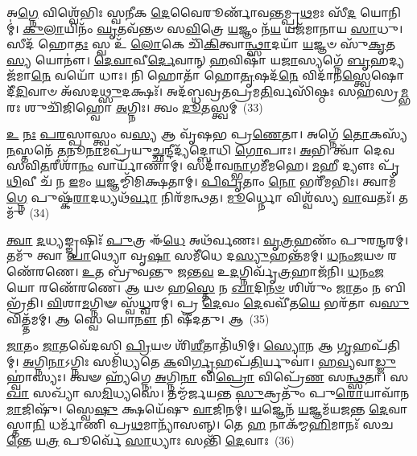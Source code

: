 𑌅\-\ul{𑌗𑍍𑌨𑍇} 𑌵𑌿𑌶𑍍𑌵𑍇᳴𑌭𑌿𑌃 𑌸𑍍𑌵𑌨𑍀𑌕 \ul{𑌦𑍇}\-𑌵𑍈𑌰𑍂𑌰𑍍𑌣𑌾᳴𑌵𑌨𑍍𑌤𑌮𑍍𑌪𑍍𑌰\-\ul{𑌥}\-𑌮𑌃 𑌸𑍀᳴\-\ul{𑌦} 𑌯𑍋𑌨𑌿𑌮𑍍॑। \ul{𑌕𑍁}\-\-\ul{𑌲𑌾}\-𑌯𑌿𑌨𑌂᳴ \ul{𑌘𑍃}\-𑌤𑌵᳴𑌨𑍍𑌤𑍞 𑌸\-\ul{𑌵𑌿}\-𑌤𑍍𑌰𑍇 \ul{𑌯}\-𑌜𑍍𑌞𑌂 𑌨᳴\-\ul{𑌯} 𑌯𑌜᳴𑌮𑌾𑌨𑌾𑌯 \ul{𑌸𑌾}\-𑌧𑍁। 𑌸𑍀𑌦᳴ 𑌹𑍋\-\ul{𑌤𑌃} 𑌸𑍍𑌵 𑌉᳴ \ul{𑌲𑍋}\-𑌕𑍇 𑌚𑌿᳴\-\ul{𑌕𑌿}\-𑌤𑍍𑌵𑌾\-\ul{𑌨𑍍𑌥𑍍𑌸𑌾}\-𑌦𑌯𑌾᳴ \ul{𑌯}\-𑌜𑍍𑌞𑍞 𑌸𑍁᳴\-\ul{𑌕𑍃}\-𑌤\-\ul{𑌸𑍍𑌯} 𑌯𑍋𑌨𑍗॑। \ul{𑌦𑍇}\-\-\ul{𑌵𑌾}\-𑌵𑍀\-\ul{𑌰𑍍𑌦𑍇}\-𑌵𑌾𑌨𑍍 \ul{𑌹}\-𑌵𑌿𑌷𑌾᳴ 𑌯\-\ul{𑌜𑌾}\-𑌸𑍍𑌯𑌗𑍍𑌨𑍇᳴ \ul{𑌬𑍃}\-𑌹𑌦𑍍𑌯𑌜᳴𑌮𑌾\-\ul{𑌨𑍇} 𑌵𑌯𑍋᳴ 𑌧𑌾𑌃। 𑌨𑌿 𑌹𑍋𑌤𑌾᳴ 𑌹𑍋\-\ul{𑌤𑍃}\-𑌷𑌦᳴\-\ul{𑌨𑍇} 𑌵𑌿𑌦𑌾᳴𑌨\-\ul{𑌸𑍍𑌤𑍍𑌵𑍇}\-𑌷𑍋 𑌦𑍀᳴\-\ul{𑌦𑌿}\-𑌵𑌾𑍞 𑌅᳴𑌸𑌦\-\ul{𑌥𑍍𑌸𑍁}\-𑌦𑌕𑍍𑌷𑌃᳴। 𑌅𑌦᳴𑌬𑍍𑌧𑌵𑍍𑌰𑌤𑌪𑍍𑌰𑌮\-\ul{𑌤𑌿}\-𑌰𑍍𑌵𑌸𑌿᳴𑌷𑍍𑌠𑌃 𑌸𑌹𑌸𑍍𑌰\-\ul{𑌮𑍍𑌭}\-𑌰𑌃 𑌶𑍁𑌚𑌿᳴𑌜𑌿𑌹𑍍𑌵𑍋 \ul{𑌅}\-𑌗𑍍𑌨𑌿𑌃। 𑌤𑍍𑌵𑌂 \ul{𑌦𑍂}\-𑌤𑌸𑍍𑌤𑍍𑌵𑌮𑍍~(33)

\-\ul{𑌉} \ul{𑌨𑌃} \ul{𑌪}\-\-\ul{𑌰}\-𑌸𑍍𑌪𑌾𑌸𑍍𑌤𑍍𑌵𑌂 𑌵\-\ul{𑌸𑍍𑌯} 𑌆 𑌵𑍃᳴𑌷𑌭 𑌪𑍍𑌰\-\ul{𑌣𑍇}\-𑌤𑌾। 𑌅𑌗𑍍𑌨𑍇᳴ \ul{𑌤𑍋}\-𑌕𑌸𑍍𑌯᳴ \ul{𑌨}\-𑌸𑍍𑌤𑌨𑍇᳴ \ul{𑌤}\-𑌨𑍂\-\ul{𑌨𑌾}\-𑌮𑌪𑍍𑌰᳴𑌯𑍁\-\ul{𑌚𑍍𑌛}\-𑌨𑍍𑌦𑍀𑌦𑍍𑌯᳴𑌦𑍍𑌬𑍋𑌧𑌿 \ul{𑌗𑍋}\-𑌪𑌾𑌃। \ul{𑌅}\-𑌭𑌿 𑌤𑍍𑌵𑌾᳴ 𑌦𑍇𑌵 𑌸𑌵𑌿\-\ul{𑌤}\-𑌰𑍀𑌶𑌾᳴\-\ul{𑌨𑌂} 𑌵𑌾𑌰𑍍𑌯𑌾᳴𑌣𑌾𑌮𑍍। 𑌸𑌦𑌾᳴𑌵\-\ul{𑌨𑍍𑌭𑌾}\-𑌗𑌮𑍀᳴𑌮𑌹𑍇। \ul{𑌮}\-𑌹𑍀 𑌦𑍍𑌯𑍗𑌃 𑌪𑍃᳴\-\ul{𑌥𑌿}\-𑌵𑍀 𑌚᳴ 𑌨 \ul{𑌇}\-𑌮𑌂 \ul{𑌯}\-𑌜𑍍𑌞𑌮𑍍𑌮𑌿᳴𑌮𑌿𑌕𑍍𑌷𑌤𑌾𑌮𑍍। \ul{𑌪𑌿}\-\-\ul{𑌪𑍃}\-𑌤𑌾𑌂 \ul{𑌨𑍋} 𑌭𑌰𑍀᳴𑌮𑌭𑌿𑌃। 𑌤𑍍𑌵𑌾𑌮᳴\-\ul{𑌗𑍍𑌨𑍇} 𑌪𑍁𑌷𑍍𑌕᳴\-\ul{𑌰𑌾}\-𑌦𑌧𑍍𑌯𑌥᳴\-\ul{𑌰𑍍𑌵𑌾} 𑌨𑌿𑌰᳴𑌮𑌨𑍍𑌥𑌤। \ul{𑌮𑍂}\-𑌰𑍍𑌧𑍍𑌨𑍋 𑌵𑌿𑌶𑍍𑌵᳴𑌸𑍍𑌯 \ul{𑌵𑌾}\-𑌘𑌤𑌃᳴। 𑌤𑌮𑍁᳴~(34)

\-\ul{𑌤𑍍𑌵𑌾} \ul{𑌦}\-𑌧𑍍𑌯𑌙𑍍𑌙𑍃𑌷𑌿𑌃᳴ \ul{𑌪𑍁}\-𑌤𑍍𑌰 𑌈᳴\-\ul{𑌧𑍇} 𑌅𑌥᳴𑌰𑍍𑌵𑌣𑌃। \ul{𑌵𑍃}\-\-\ul{𑌤𑍍𑌰}\-𑌹𑌣𑌂᳴ 𑌪𑍁𑌰\-\ul{𑌨𑍍𑌦}\-𑌰𑌮𑍍। 𑌤𑌮𑍁᳴ 𑌤𑍍𑌵𑌾 \ul{𑌪𑌾}\-𑌥𑍍𑌯𑍋 𑌵𑍃\-\ul{𑌷𑌾} 𑌸𑌮𑍀᳴𑌧𑍇 𑌦\-\ul{𑌸𑍍𑌯𑍁}\-𑌹𑌨𑍍𑌤᳴𑌮𑌮𑍍। \ul{𑌧}\-\-\ul{𑌨𑌂}\-\-\ul{𑌜}\-𑌯𑍞 𑌰𑌣𑍇᳴𑌰𑌣𑍇। \ul{𑌉}\-𑌤 𑌬𑍍𑌰𑍁᳴𑌵𑌨𑍍𑌤𑍁 \ul{𑌜}\-𑌨𑍍𑌤\-\ul{𑌵} 𑌉\-\ul{𑌦}\-𑌗𑍍𑌨𑌿𑌰𑍍𑌵𑍃᳴\-\ul{𑌤𑍍𑌰}\-𑌹𑌾𑌜᳴𑌨𑌿। \ul{𑌧}\-\-\ul{𑌨𑌂}\-\-\ul{𑌜}\-𑌯𑍋 𑌰𑌣𑍇᳴𑌰𑌣𑍇। 𑌆 𑌯𑍞 𑌹\-\ul{𑌸𑍍𑌤𑍇} 𑌨 \ul{𑌖𑌾}\-𑌦𑌿\-\ul{𑌨}\-\-\ul{𑍞} 𑌶𑌿𑌶𑍁𑌂᳴ \ul{𑌜𑌾}\-𑌤𑌂 𑌨 𑌬𑌿𑌭𑍍𑌰᳴𑌤𑌿। \ul{𑌵𑌿}\-𑌶𑌾\-\ul{𑌮}\-𑌗𑍍𑌨𑌿𑍟 𑌸𑍍𑌵᳴\-\ul{𑌧𑍍𑌵}\-𑌰𑌮𑍍। 𑌪𑍍𑌰 \ul{𑌦𑍇}\-𑌵𑌂 \ul{𑌦𑍇}\-𑌵𑌵𑍀᳴𑌤\-\ul{𑌯𑍇} 𑌭𑌰᳴𑌤𑌾 𑌵\-\ul{𑌸𑍁}\-𑌵𑌿𑌤𑍍𑌤᳴𑌮𑌮𑍍। 𑌆 𑌸𑍍𑌵𑍇 𑌯𑍋\-\ul{𑌨𑍗} 𑌨𑌿 𑌷𑍀᳴𑌦𑌤𑍁। 𑌆~(35)


\-\ul{𑌜𑌾}\-𑌤𑌂 \ul{𑌜𑌾}\-𑌤𑌵𑍇᳴𑌦𑌸𑌿 \ul{𑌪𑍍𑌰𑌿}\-𑌯𑍞 𑌶𑌿᳴\-\ul{𑌶𑍀}\-𑌤𑌾𑌤𑌿᳴𑌥𑌿𑌮𑍍। \ul{𑌸𑍍𑌯𑍋}\-𑌨 𑌆 \ul{𑌗𑍃}\-𑌹𑌪᳴𑌤𑌿𑌮𑍍। \ul{𑌅}\-𑌗𑍍𑌨𑌿\-\ul{𑌨𑌾}\-𑌽𑌗𑍍𑌨𑌿𑌃 𑌸𑌮𑌿᳴𑌧𑍍𑌯𑌤𑍇 \ul{𑌕}\-𑌵𑌿\-\ul{𑌰𑍍𑌗𑍃}\-𑌹𑌪᳴\-\ul{𑌤𑌿}\-𑌰𑍍𑌯𑍁𑌵𑌾॑। \ul{𑌹}\-\-\ul{𑌵𑍍𑌯}\-𑌵𑌾\-\ul{𑌡𑍍𑌜𑍁}\-𑌹𑍍𑌵𑌾॑𑌸𑍍𑌯𑌃। 𑌤𑍍𑌵𑍟 𑌹𑍍𑌯᳴𑌗𑍍𑌨𑍇 \ul{𑌅}\-𑌗𑍍𑌨𑌿\-\ul{𑌨𑌾} 𑌵𑌿\-\ul{𑌪𑍍𑌰𑍋} 𑌵𑌿𑌪𑍍𑌰𑍇᳴\-\ul{𑌣} 𑌸\-\ul{𑌨𑍍𑌥𑍍𑌸}\-𑌤𑌾। 𑌸\-\ul{𑌖𑌾} 𑌸𑌖𑍍𑌯𑌾᳴ 𑌸\-\ul{𑌮𑌿}\-𑌧𑍍𑌯𑌸𑍇॑। 𑌤𑌮𑍍𑌮᳴𑌰𑍍𑌜𑌯𑌨𑍍𑌤 \ul{𑌸𑍁}\-𑌕𑍍𑌰𑌤𑍁𑌂᳴ 𑌪𑍁\-\ul{𑌰𑍋}\-𑌯𑌾𑌵𑌾᳴𑌨\-\ul{𑌮𑌾}\-𑌜𑌿𑌷𑍁᳴। 𑌸𑍍𑌵𑍇\-\ul{𑌷𑍁} 𑌕𑍍𑌷𑌯𑍇᳴𑌷𑍁 \ul{𑌵𑌾}\-𑌜𑌿𑌨𑌮𑍍॑। \ul{𑌯}\-𑌜𑍍𑌞𑍇𑌨᳴ \ul{𑌯}\-𑌜𑍍𑌞𑌮᳴𑌯𑌜𑌨𑍍𑌤 \ul{𑌦𑍇}\-𑌵𑌾𑌸𑍍𑌤𑌾\-\ul{𑌨𑌿} 𑌧𑌰𑍍𑌮𑌾᳴𑌣𑌿 𑌪𑍍𑌰\-\ul{𑌥}\-𑌮𑌾𑌨𑍍𑌯𑌾᳴𑌸𑌨𑍍𑌨𑍍। 𑌤𑍇 \ul{𑌹} 𑌨𑌾𑌕᳴𑌮𑍍𑌮\-\ul{𑌹𑌿}\-𑌮𑌾𑌨𑌃᳴ 𑌸𑌚\-\ul{𑌨𑍍𑌤𑍇} 𑌯\-\ul{𑌤𑍍𑌰} 𑌪𑍂𑌰𑍍𑌵𑍇᳴ \ul{𑌸𑌾}\-𑌧𑍍𑌯𑌾𑌃 𑌸𑌨𑍍𑌤𑌿᳴ \ul{𑌦𑍇}\-𑌵𑌾𑌃~(36)


{\anuvakamend[{𑌵𑍋𑌢᳴𑌵𑍇 \ul{𑌦𑍂}\-𑌤𑌸𑍍𑌤𑍍𑌵𑌨𑍍𑌤𑌮𑍁᳴ 𑌸𑍀\-\ul{𑌦}\-𑌤𑍍𑌵𑌾 𑌯𑌤𑍍𑌰᳴ \ul{𑌚}\-𑌤𑍍𑌵𑌾𑌰𑌿᳴ 𑌚}]}%

{}

